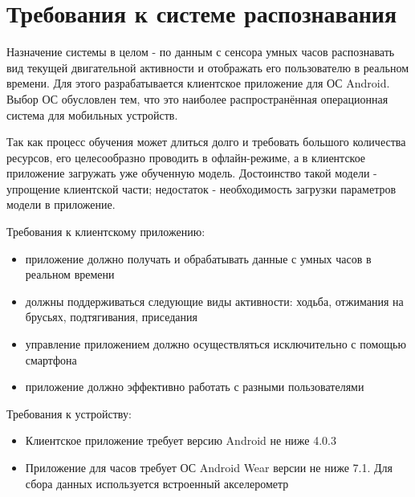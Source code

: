 
\section{Требования к системе распознавания}

Назначение системы в целом - по данным с сенсора умных часов распознавать вид текущей двигательной активности и отображать его пользователю в реальном времени. Для этого разрабатывается клиентское приложение для ОС Android. Выбор ОС обусловлен тем, что это наиболее распространённая операционная система для мобильных устройств. 

Так как процесс обучения может длиться долго и требовать большого количества ресурсов, его целесообразно проводить в офлайн-режиме, а в клиентское приложение загружать уже обученную модель. Достоинство такой модели - упрощение клиентской части; недостаток - необходимость загрузки параметров модели в приложение.

Требования к клиентскому приложению:

\begin{itemize}
\item приложение должно получать и обрабатывать данные с умных часов в реальном времени
\item должны поддерживаться следующие виды активности: ходьба, отжимания на брусьях, подтягивания, приседания
\item управление приложением должно осуществляться исключительно с помощью смартфона
\item приложение должно эффективно работать с разными пользователями
\end{itemize}

Требования к устройству:
\begin{itemize}
\item Клиентское приложение требует версию Android не ниже 4.0.3
\item Приложение для часов требует ОС Android Wear версии не ниже 7.1. Для сбора данных используется встроенный акселерометр
\end{itemize}
